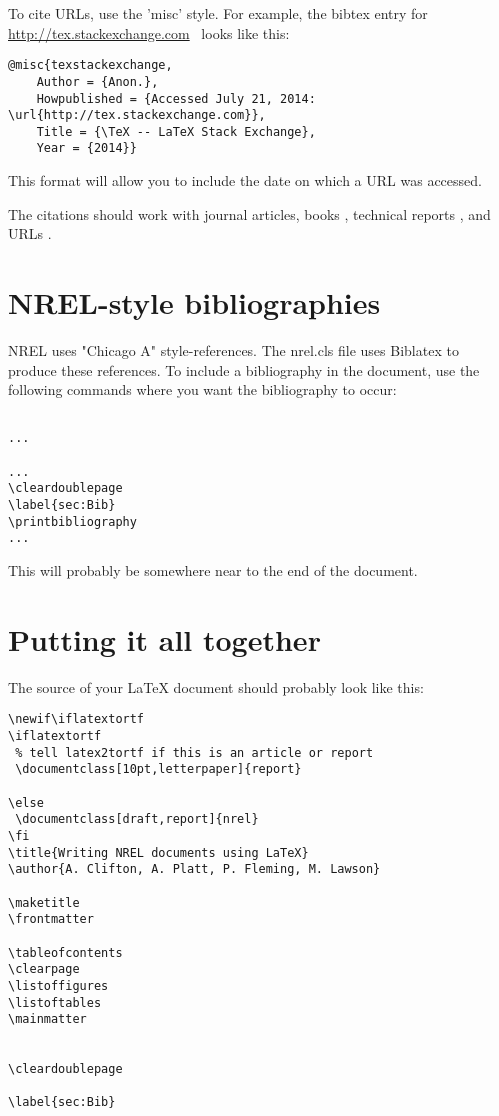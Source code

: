 To cite URLs, use the 'misc' style. For example, the bibtex entry for \href{http://tex.stackexchange.com}{http://tex.stackexchange.com}\ \cite{texstackexchange} looks like this:

\begin{verbatim}
@misc{texstackexchange,
	Author = {Anon.},
	Howpublished = {Accessed July 21, 2014: \url{http://tex.stackexchange.com}},
	Title = {\TeX -- LaTeX Stack Exchange},
	Year = {2014}}
\end{verbatim}

This format will allow you to include the date on which a URL was accessed.

The citations should work with journal articles, books \cite{Lamport_1986_a}, technical reports \cite{TechReportTest}, and URLs \cite{texstackexchange}.

\section{NREL-style bibliographies}
NREL uses "Chicago A" style-references. The nrel.cls file uses Biblatex to produce these references. To include a bibliography in the document, use the following commands where you want the bibliography to occur:

\begin{verbatim}

...

...
\cleardoublepage
\label{sec:Bib}
\printbibliography
...
\end{verbatim}

This will probably be somewhere near to the end of the document.



\section{Putting it all together}
The source of your LaTeX document should probably look like this:

\begin{verbatim}
\newif\iflatextortf
\iflatextortf
 % tell latex2tortf if this is an article or report
 \documentclass[10pt,letterpaper]{report}
 
\else
 \documentclass[draft,report]{nrel} 
\fi
\title{Writing NREL documents using LaTeX}
\author{A. Clifton, A. Platt, P. Fleming, M. Lawson}

\maketitle
\frontmatter

\tableofcontents
\clearpage
\listoffigures
\listoftables
\mainmatter


\cleardoublepage

\label{sec:Bib}


\end{verbatim}

